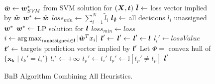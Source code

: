\begin{figure}[t!]
\vspace{-3mm}
\caption{
BnB Algorithm Combining All Heuristics. \\
}
\label{alg:BnB.Final}
{\footnotesize
\begin{algorithmic}[1]
\State $\tilde{\boldsymbol{w}} \gets \boldsymbol{w}^*_{\mathit{SVM}}$ from SVM solution for $(\boldsymbol{X},\boldsymbol{t})$
\State $\tilde{\boldsymbol{l}} \gets $ loss vector implied by $\tilde{\boldsymbol{w}}$
\State $\boldsymbol{w}^* \gets \tilde{\boldsymbol{w}}$
\State $loss_{min} \gets \sum_{i=1}^N \tilde{l}_i$ 
\State $\boldsymbol{l}_\emptyset \gets $ all decisions $l_i$ unassigned
\State {}
\State \Return $\boldsymbol{w}^*$
\Statex
{}
      \State $\boldsymbol{w}^* \gets$ LP solution for $\boldsymbol{l}$ 
      \State $loss_{min} \gets loss$
   \Else
      \State $i \gets \argmax_{i \text{unassigned} \in \l} |\tilde{\w}^Tx_i|$
      \State $\boldsymbol{l}' \gets$ 
         \State {}
      \EndIf
      \State $\boldsymbol{l}' \gets$ 
         \State {}
      \EndIf
   \EndIf
\EndProcedure
\Statex
{} 
   \State $\boldsymbol{l}' \gets \boldsymbol{l}$
   \State $l_i' \gets lossValue$   
   \State $\boldsymbol{t}' \gets $ targets prediction vector implied by $\boldsymbol{l}'$ 
   \State Let $\Phi =$ convex hull of $\{ \boldsymbol{x_k} \; | \; t_k'=t_i' \}$ 
      \State $l_i' \gets +\infty$ 
   \Else
         \State $t_p' \gets t_i'$ 
         \State $l_p' \gets \mathbb{I} [t_p' \not= t_p]$
      \EndIf
   \EndFor
   \EndIf  
   \State \Return $\boldsymbol{l}'$ 
\EndFunction
\Statex
\EndFunction
\end{algorithmic}}
\vspace{-4mm}
\end{figure}

